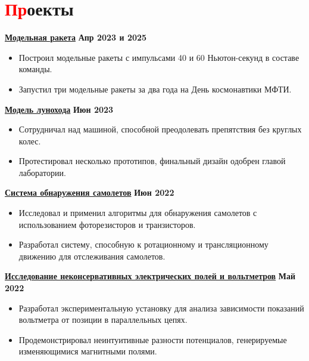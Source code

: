 \documentclass[a4paper, 10pt]{article}
\begin{document}
\section{\textcolor{red}{Пр}оекты}
    {\href{https://github.com/icarus-imperium/rocket-2025}{\textbf{Модельная ракета}}} \hfill \textbf{Апр 2023 и 2025} \\
    \begin{itemize}
        \vspace{-9pt}
    \item Построил модельные ракеты с импульсами 40 и 60 Ньютон-секунд в составе команды.
        \vspace{-9pt}
    \item Запустил три модельные ракеты за два года на День космонавтики МФТИ.
    \end{itemize}
    \vspace{-9pt}
    {\href{https://github.com/rezaaliasgarirenani/Rover}{\textbf{Модель лунохода}}} \hfill \textbf{Июн 2023}
    \begin{itemize}
        \vspace{-9pt}
    \item Сотрудничал над машиной, способной преодолевать препятствия без круглых колес.
        \vspace{-9pt}
    \item Протестировал несколько прототипов, финальный дизайн одобрен главой лаборатории.
    \end{itemize}
    \vspace{-9pt}
    {\href{https://github.com/rezaaliasgarirenani/Aircraft-Detection-System}{\textbf{Система обнаружения самолетов}}} \hfill \textbf{Июн 2022}
    \begin{itemize}
        \vspace{-9pt}
    \item Исследовал и применил алгоритмы для обнаружения самолетов с использованием фоторезисторов и транзисторов.
        \vspace{-9pt}
    \item Разработал систему, способную к ротационному и трансляционному движению для отслеживания самолетов.
    \end{itemize}
    \vspace{-9pt}
    {\href{https://github.com/rezaaliasgarirenani/Non-Conservative-Electric-Fields-and-Voltmeters}{\textbf{Исследование неконсервативных электрических полей и вольтметров}}} \hfill \textbf{Май 2022} \\
    \begin{itemize}
        \vspace{-9pt}
    \item Разработал экспериментальную установку для анализа зависимости показаний вольтметра от позиции в параллельных цепях.
        \vspace{-9pt}
    \item Продемонстрировал неинтуитивные разности потенциалов, генерируемые изменяющимися магнитными полями.
    \end{itemize}
    \vspace{-10pt}
\end{document}
